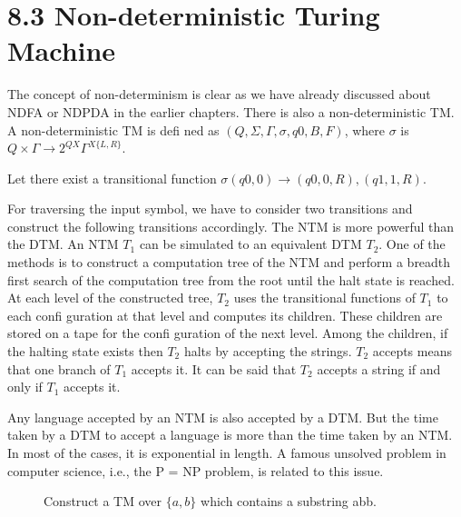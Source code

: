 \documentclass[fontsize=8pt,paper=A4, DIV=9]{scrartcl}
\begin{document}
\section*{8.3  Non-deterministic Turing Machine}
The concept of non-determinism is clear as we have already discussed about NDFA or NDPDA in the
earlier chapters. There is also a non-deterministic TM. A non-deterministic TM is defi ned as $(Q,\Sigma,\Gamma, \sigma,
q0
, B, F)$, where $\sigma$ is $Q \times\Gamma\rightarrow 2^{Q X }  \Gamma^{X  \lbrace L,R \rbrace}$.


Let there exist a transitional function $\sigma(q0
, 0)\rightarrow (q0
, 0, R), (q1
, 1, R)$.

For traversing the input symbol, we have to consider two transitions and construct the following
transitions accordingly.
The NTM is more powerful than the DTM. An NTM $T_{1}$
 can be simulated to an equivalent DTM $T_{2}$.
One of the methods is to construct a computation tree of the NTM and perform a breadth first search of
the computation tree from the root until the halt state is reached. At each level of the constructed tree, $T_{2}$
uses the transitional functions of $T_{1}$
 to each confi guration at that level and computes its children. These
children are stored on a tape for the confi guration of the next level. Among the children, if the halting
state exists then $T_{2}$
 halts by accepting the strings. $T_{2}$
 accepts means that one branch of $T_{1}$
 accepts it. It
can be said that $T_{2}$
 accepts a string if and only if $T_{1}$
 accepts it.
 
 Any language accepted by an NTM is also accepted by a DTM. But the time taken by a DTM to
accept a language is more than the time taken by an NTM. In most of the cases, it is exponential in
length. A famous unsolved problem in computer science, i.e., the P = NP problem, is related to this issue.


 \begin{figure}[H] %
  Construct a TM over $\lbrace a, b \rbrace$ which contains a substring abb.
\end{figure}
\end{document}
